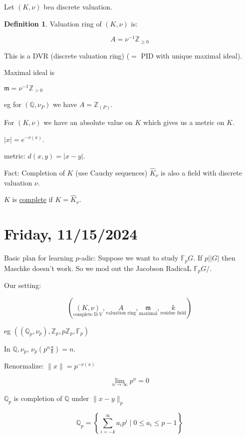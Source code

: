 \documentclass{article}
\theoremstyle{definition}
\newtheorem*{definition}{Definition}
\begin{document}
Let \((K,\nu)\) bea discrete valuation.

\begin{definition}
    Valuation ring of \((K,\nu)\) is:

    \[
        A = \nu ^{-1} \mathbb{Z}_{\geq 0}
    \]

    This is a DVR (discrete valuation ring) (\(=\) PID with unique maximal ideal).

    Maximal ideal is

    \(\mathfrak{m} = \nu ^{-1} \mathbb{Z}_{> 0}\)

    eg for \((\mathbb{Q}, \nu_P)\) we have \(A = \mathbb{Z}_{(P)}\).

    For \((K, \nu)\) we have an absolute value on \(K\) which gives us a metric on \(K\).

    \(\vert x \vert = e^{-\nu(x)}\).

    metric: \(d(x,y) = \vert x - y \vert\).
\end{definition}

Fact: Completion of \(K\) (use Cauchy sequences) \(\widehat{K}_\nu\) is also a field with discrete valuation \(\nu\).

\(K\) is \underline{complete} if \(K = \widehat{K}_\nu\).

\section*{Friday, 11/15/2024}

Basic plan for learning \(p\)-adic: Suppose we want to study \(\mathbb{F}_p G\). If \(p\mid \vert G \vert\) then Maschke doesn't work. So we mod out the Jacobson RadicaL \(\mathbb{F}_p G /\).

Our setting:

\[
    (\underset{\text{complete D.V}}{(K,\nu)}, \underset{\text{valuation ring}}{A}, \underset{\text{maximal}}{\mathfrak{m}}, \underset{\text{residue field} }{k} )
\]

eg \(((\mathbb{Q}_p, \nu_p),\mathbb{Z}_p, p \mathbb{Z}_p, \mathbb{F}_p)\) 

In \(\mathbb{Q}, \nu_p\), \(\nu_p(p^n \frac{a}{b}) = n\).

Renormalize: \(\lVert x \rVert = p^{-\nu(x)}\)

\[
    \lim_{n \to \infty} p^n = 0
\]

\(\mathbb{Q}_p\) is completion of \(\mathbb{Q}\) under \(\lVert x-y \rVert _p\)

\[
    \mathbb{Q}_p= \left\{\sum_{i=-k}^{\infty} a_i p^i \mid 0 \leq a_i \leq p-1 \right\}
\]
\end{document}
